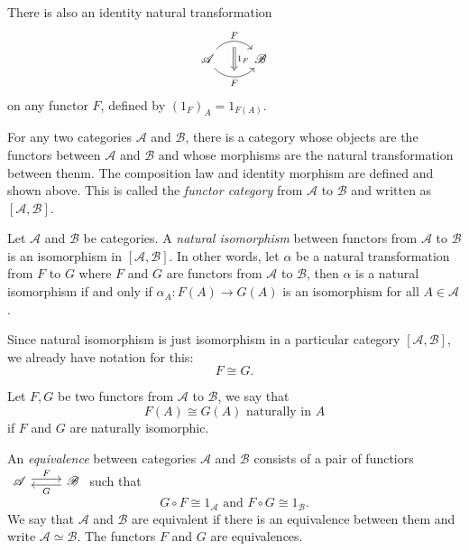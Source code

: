   There is also an identity natural transformation
  \[
  \begin{tikzcd}
    \mathscr{A}\arrow[r, bend left=50, "F",""{name=U, below}]\arrow[r, bend right=50, "F"', ""{name=D}]& \mathscr{B} \arrow[Rightarrow, "1_F", from=U, to=D]   
  \end{tikzcd}
  \] 
  on any functor $F$, defined by $(1_F)_A=1_{F(A)}$. 
  \begin{definition}
    For any two categories $\mathscr{A}$ and $\mathscr{B}$, there is a category whose objects are the functors between $\mathscr{A}$ and $\mathscr{B}$ and whose morphisms are the natural transformation between thenm. The composition law and identity morphism are defined and shown above. This is called the \textit{functor category} from $\mathscr{A}$ to $\mathscr{B}$ and written as $[\mathscr{A},\mathscr{B}]$.
  \end{definition}


  \begin{definition}
    Let $\mathscr{A}$ and $\mathscr{B}$ be categories. A \textit{natural isomorphism} between functors from $\mathscr{A}$ to $\mathscr{B}$ is an isomorphism in $\left[ \mathscr{A},\mathscr{B} \right] $. In other words, let  $\alpha$ be a natural transformation from $F$ to $G$ where $F$ and $G$ are functors from $\mathscr{A}$ to $\mathscr{B}$, then $\alpha$ is a natural isomorphism if and only if $\alpha_A:F(A)\to G(A)$ is an isomorphism for all $A\in \mathscr{A}$.
  \end{definition}

  Since natural isomorphism is just isomorphism in a particular category $\left[ \mathscr{A},\mathscr{B} \right] $, we already have notation for this: 
  \[
  F\cong G.
  \] 

  \begin{definition}
    Let $F,G$ be two functors from $\mathscr{A}$ to $\mathscr{B}$, we say that 
    \[
      F(A)\cong G(A) \text{ naturally in }A
    \] if $F$ and $G$ are naturally isomorphic.
  \end{definition}

  \begin{definition}
    An \textit{equivalence } between categories $\mathscr{A}$ and $\mathscr{B}$ consists of a pair of functiors $ 
  \begin{tikzcd} 
    \mathscr{A}\arrow[r, shift left, "F"] \arrow[r, leftarrow, shift right, "G"']&\mathscr{B}  
  \end{tikzcd}
  $
  such that 
  \begin{equation}
  G\circ F \cong 1_{\mathscr{A}} \text{ and }F\circ G \cong 1_{\mathscr{B}}.
\end{equation} 
  We say that $\mathscr{A}$ and $\mathscr{B}$ are equivalent if there is an equivalence between them and write $\mathscr{A}\simeq \mathscr{B}$. The functors $F$ and $G$ are equivalences.
  \end{definition}

